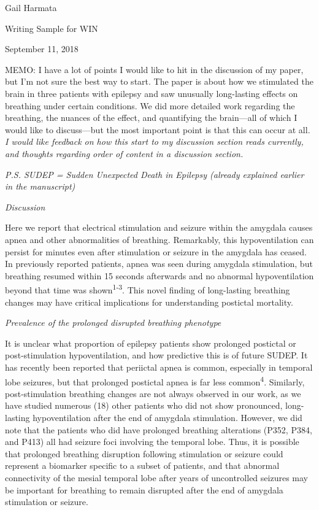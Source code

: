\documentclass[]{article}
\date{}
\begin{document}
Gail Harmata

Writing Sample for WIN

September 11, 2018

MEMO: I have a lot of points I would like to hit in the discussion of my
paper, but I'm not sure the best way to start. The paper is about how we
stimulated the brain in three patients with epilepsy and saw unusually
long-lasting effects on breathing under certain conditions. We did more
detailed work regarding the breathing, the nuances of the effect, and
quantifying the brain---all of which I would like to discuss---but the
most important point is that this can occur at all. \emph{\emph{I would
like feedback on how this start to my discussion section reads
currently, and thoughts regarding order of content in a discussion
section. }}

\emph{P.S. SUDEP = Sudden Unexpected Death in Epilepsy (already
explained earlier in the manuscript)}

\emph{Discussion}

Here we report that electrical stimulation and seizure within the
amygdala causes apnea and other abnormalities of breathing.
Remarkably, this hypoventilation can persist for minutes even after
stimulation or seizure in the amygdala has ceased. In previously
reported patients, apnea was seen during amygdala stimulation, but
breathing resumed within 15 seconds afterwards and no abnormal
hypoventilation beyond that time was shown\textsuperscript{1-3}. This
novel finding of long-lasting breathing changes may have critical
implications for understanding postictal mortality.

\emph{Prevalence of the prolonged disrupted breathing phenotype}

It is unclear what proportion of epilepsy patients show prolonged
postictal or post-stimulation hypoventilation, and how predictive this
is of future SUDEP. It has recently been reported that periictal apnea
is common, especially in temporal lobe seizures, but that prolonged
postictal apnea is far less common\textsuperscript{4}. Similarly,
post-stimulation breathing changes are not always observed in our work,
as we have studied numerous (18) other patients who did not show
pronounced, long-lasting hypoventilation after the end of amygdala
stimulation. However, we did note that the patients who did have
prolonged breathing alterations (P352, P384, and P413) all had seizure
foci involving the temporal lobe. Thus, it is possible that prolonged
breathing disruption following stimulation or seizure could represent a
biomarker specific to a subset of patients, and that abnormal
connectivity of the mesial temporal lobe after years of uncontrolled
seizures may be important for breathing to remain disrupted after the
end of amygdala stimulation or seizure.
\end{document}
